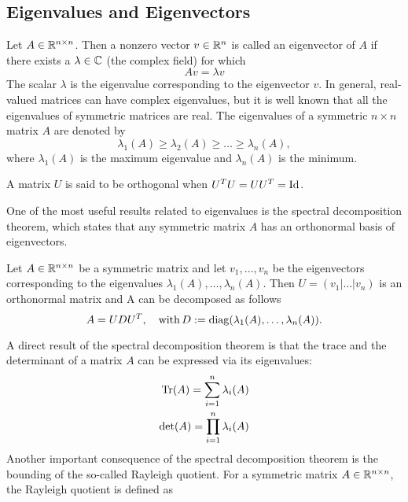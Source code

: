 \documentclass[10pt,a4paper]{article}
\begin{document}
\subsection{Eigenvalues and Eigenvectors}
Let $A \in \mathbb{R}^{n\times n}$. Then a nonzero vector $v \in \mathbb{R}^n$ is called an eigenvector of $A$ if there exists a $\lambda \in \mathbb{C}$ (the complex field) for which
\begin{equation*}
	A v = \lambda v
\end{equation*}
The scalar $\lambda$ is the eigenvalue corresponding to the eigenvector $v$. In general, real-valued matrices can have complex eigenvalues, but it is well known that all the eigenvalues of symmetric matrices are real. The eigenvalues of a symmetric $n \times n$ matrix $A$ are denoted by
\begin{equation*}
	\lambda_1(A)\geq \lambda_2(A) \geq \dots \geq \lambda_n(A),
\end{equation*}
where $\lambda_1(A)$ is the maximum eigenvalue and $\lambda_n(A)$ is the minimum.
\begin{definition}
	A matrix $U$ is said to be orthogonal when $U^TU =UU^T=\text{Id}$.
\end{definition}
One of the most useful results related to eigenvalues is the spectral decomposition theorem, which states that any symmetric matrix $A$ has an orthonormal basis of eigenvectors.
\begin{theorem}
	Let $A\in \mathbb{R}^{n\times n}$ be a symmetric matrix and let $v_1,\dots, v_n$ be the eigenvectors corresponding to the eigenvalues $\lambda_1(A), \dots, \lambda_n(A)$. Then $U= \left(v_1 | \dots | v_n\right)$ is an orthonormal matrix and A can be decomposed as follows 
	\begin{equation*}
		A = UDU^T, \quad \mathord{\mathrm{with }}\, D:=\mathord{\mathrm{diag}}(\lambda_1(A), \dots, \lambda_n(A)).
	\end{equation*}
\end{theorem}
A direct result of the spectral decomposition theorem is that the trace and the determinant of a matrix $A$ can be expressed via its eigenvalues:
\begin{equation*}
	\begin{split}
		\mathord{\mathrm{Tr}}(A) = \sum_{i=1}^n \lambda_i(A)\\
		\det(A) = \prod_{i=1}^n \lambda_i(A)
	\end{split}
\end{equation*}
Another important consequence of the spectral decomposition theorem is the bounding of the so-called Rayleigh quotient. For a symmetric matrix $A \in \mathbb{R}^{n\times n}$, the Rayleigh quotient is defined as
\end{document}
